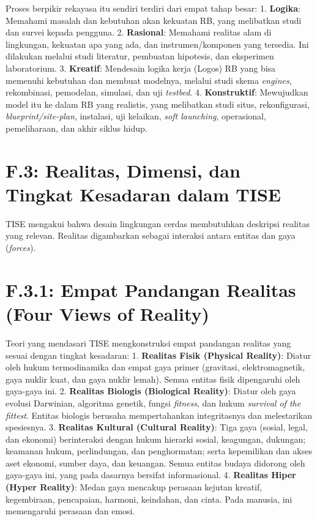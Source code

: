 \documentclass[
  letterpaper,
  DIV=11,
  numbers=noendperiod]{scrreprt}
\begin{document}
Proses berpikir rekayasa itu sendiri terdiri dari empat tahap besar: 1.
\textbf{Logika}: Memahami masalah dan kebutuhan akan kekuatan RB, yang
melibatkan studi dan survei kepada pengguna. 2. \textbf{Rasional}:
Memahami realitas alam di lingkungan, kekuatan apa yang ada, dan
instrumen/komponen yang tersedia. Ini dilakukan melalui studi literatur,
pembuatan hipotesis, dan eksperimen laboratorium. 3. \textbf{Kreatif}:
Mendesain logika kerja (Logos) RB yang bisa memenuhi kebutuhan dan
membuat modelnya, melalui studi skema \emph{engines}, rekombinasi,
pemodelan, simulasi, dan uji \emph{testbed}. 4. \textbf{Konstruktif}:
Mewujudkan model itu ke dalam RB yang realistis, yang melibatkan studi
situs, rekonfigurasi, \emph{blueprint/site-plan}, instalasi, uji
kelaikan, \emph{soft launching}, operasional, pemeliharaan, dan akhir
siklus hidup.

\section{\texorpdfstring{\textbf{F.3: Realitas, Dimensi, dan Tingkat
Kesadaran dalam
TISE}}{F.3: Realitas, Dimensi, dan Tingkat Kesadaran dalam TISE}}\label{f.3-realitas-dimensi-dan-tingkat-kesadaran-dalam-tise}

TISE mengakui bahwa desain lingkungan cerdas membutuhkan deskripsi
realitas yang relevan. Realitas digambarkan sebagai interaksi antara
entitas dan gaya (\emph{forces}).

\section{\texorpdfstring{\textbf{F.3.1: Empat Pandangan Realitas (Four
Views of
Reality)}}{F.3.1: Empat Pandangan Realitas (Four Views of Reality)}}\label{f.3.1-empat-pandangan-realitas-four-views-of-reality}

Teori yang mendasari TISE mengkonstruksi empat pandangan realitas yang
sesuai dengan tingkat kesadaran: 1. \textbf{Realitas Fisik (Physical
Reality)}: Diatur oleh hukum termodinamika dan empat gaya primer
(gravitasi, elektromagnetik, gaya nuklir kuat, dan gaya nuklir lemah).
Semua entitas fisik dipengaruhi oleh gaya-gaya ini. 2. \textbf{Realitas
Biologis (Biological Reality)}: Diatur oleh gaya evolusi Darwinian,
algoritma genetik, fungsi \emph{fitness}, dan hukum \emph{survival of
the fittest}. Entitas biologis berusaha mempertahankan integritasnya dan
melestarikan spesiesnya. 3. \textbf{Realitas Kultural (Cultural
Reality)}: Tiga gaya (sosial, legal, dan ekonomi) berinteraksi dengan
hukum hierarki sosial, keagungan, dukungan; keamanan hukum,
perlindungan, dan penghormatan; serta kepemilikan dan akses aset
ekonomi, sumber daya, dan keuangan. Semua entitas budaya didorong oleh
gaya-gaya ini, yang pada dasarnya bersifat informasional. 4.
\textbf{Realitas Hiper (Hyper Reality)}: Medan gaya mencakup perasaan
kejutan kreatif, kegembiraan, pencapaian, harmoni, keindahan, dan cinta.
Pada manusia, ini memengaruhi perasaan dan emosi.
\end{document}
